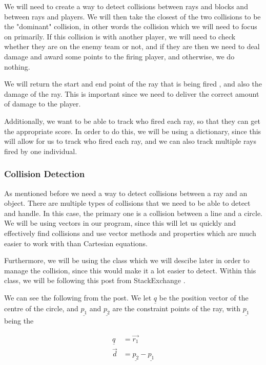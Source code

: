 \vs
We will need to create a way to detect collisions between rays and blocks and between rays and players. We will then take the closest of the two collisions to be the "dominant" collision, in other words the collision which we will need to focus on primarily. If this collision is with another player, we will need to check whether they are on the enemy team or not, and if they are then we need to deal damage and award some points to the firing player, and otherwise, we do nothing.

\vs
We will return the start and end point of the ray that is being fired , and also the damage of the ray. This is important since we need to deliver the correct amount of damage to the player.
\vs

Additionally, we want to be able to track who fired each ray, so that they can get the appropriate score. In order to do this, we will be using a dictionary, since this will allow for us to track who fired each ray, and we can also track multiple rays fired by one individual.

\subsubsection{Collision Detection}

As mentioned before we need a way to detect collisions between a ray and an object. There are multiple types of collisions that we need to be able to detect and handle. In this case, the primary one is a collision between a line and a circle. We will be using vectors in our program, since this will let us quickly and effectively find collisions and use vector methods and properties which are much easier to work with than Cartesian equations.

\vs
Furthermore, we will be using the  class which we will descibe later in order to manage the collision, since this would make it a lot easier to detect. Within this class, we will be following this post from StackExchange \cite{line_circle_collision}.

\vs
We can see the following from the post. We let $\underline{q}$ be the position vector of the centre of the circle, and $\underline{p_1}$ and $\underline{p_2}$ are the constraint points of the ray, with $\underline{p_1}$ being the 

\begin{align*}
    \underline{q} &= \vec{r_1}\\
    \vec{d} &= \underline{p_2} - \underline{p_1}\\
\end{align*}

